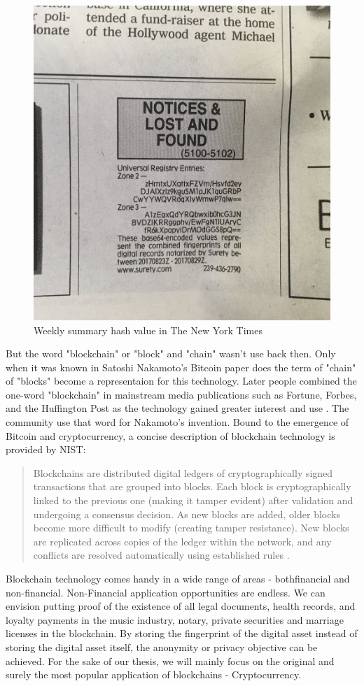 \begin{figure}[ht!]
  \centering
  \includegraphics[width=.35\textwidth]{images/Widely_Witnessed_Values.jpg}
  \caption[Widely-Witnessed Values of Surety, a weekly summary (hash) of documents]{Weekly summary hash value in The New York Times}
  \label{fig:first_blockchain}
\end{figure}

But the word "blockchain" or "block" and "chain" wasn't use back then.
Only when it was known in Satoshi Nakamoto's Bitcoin paper does the term of "chain" of "blocks" become a representaion for this technology.
Later people combined the one-word "blockchain" in mainstream media publications such as Fortune, Forbes, and the Huffington Post as the technology gained greater interest and use \cite{blockchain:meaning}.
The community use that word for Nakamoto's invention.
Bound to the emergence of Bitcoin and cryptocurrency, a concise description of blockchain technology is provided by NIST:

\begin{quote} 
  Blockchains are distributed digital ledgers of cryptographically signed transactions that are grouped into blocks. Each block is cryptographically linked to the previous one (making it tamper evident) after validation and undergoing a consensus decision. As new blocks are added, older blocks become more difficult to modify (creating tamper resistance). New blocks are replicated across copies of the ledger within the network, and any conflicts are resolved automatically using established rules \cite{BlkchainOverview}.
\end{quote}

Blockchain technology comes handy in a wide range of areas - both ​financial and non-financial​.
Non-Financial application opportunities are endless.
We can envision putting proof of the existence of all legal documents, health records, and loyalty payments in the music industry, notary, private securities and marriage licenses in the blockchain.
By storing the fingerprint of the digital asset instead of storing the digital asset itself, the anonymity or privacy objective can be achieved.
For the sake of our thesis, we will mainly focus on the original and surely the most popular application of blockchains - Cryptocurrency.

